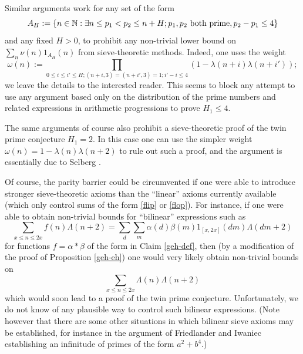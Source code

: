 \begin{remark}  Similar arguments work for any set of the form
$$ A_H := \{ n \in \mathbb{N}: \exists n \leq p_1 < p_2 \leq n+H; p_1,p_2 \hbox{ both prime}, p_2 - p_1 \leq 4 \}$$
and any fixed $H > 0$, to prohibit any non-trivial lower bound on $\sum_n \nu(n) 1_{A_H}(n)$ from sieve-theoretic methods. Indeed, one uses the weight
$$ \omega(n) := \prod_{0 \leq i \leq i' \leq H; (n+i,3) = (n+i',3) = 1; i'-i \leq 4} (1 - \lambda(n+i) \lambda(n+i'));$$
we leave the details to the interested reader.  This seems to block any attempt to use any argument based only on the distribution of the prime numbers and related expressions in arithmetic progressions to prove $H_1 \leq 4$.
\end{remark}

The same arguments of course also prohibit a sieve-theoretic proof of the twin prime conjecture $H_1 = 2$.   In this case one can use the simpler weight $\omega(n) = 1 - \lambda(n) \lambda(n+2)$ to rule out such a proof, and the argument is essentially due to Selberg \cite{selberg}.

Of course, the parity barrier could be circumvented if one were able to introduce stronger sieve-theoretic axioms than the ``linear'' axioms currently available (which only control sums of the form \eqref{flip} or \eqref{flop}).  For instance, if one were able to obtain non-trivial bounds for ``bilinear'' expressions such as
$$ \sum_{x \leq n \leq 2x} f(n) \Lambda(n+2) = \sum_d \sum_m \alpha(d) \beta(m) 1_{[x,2x]}(dm) \Lambda(dm+2)$$
for functions $f = \alpha \ast \beta$ of the form in Claim \ref{geh-def}, then (by a modification of the proof of Proposition \ref{geh-eh}) one would very likely obtain non-trivial bounds on
$$ \sum_{x \leq n \leq 2x} \Lambda(n) \Lambda(n+2)$$
which would soon lead to a proof of the twin prime conjecture.  Unfortunately, we do not know of any plausible way to control such bilinear expressions.  (Note however that there are some other situations in which bilinear sieve axioms may be established, for instance in the argument of Friedlander and Iwaniec \cite{fi} establishing an infinitude of primes of the form $a^2+b^4$.)

